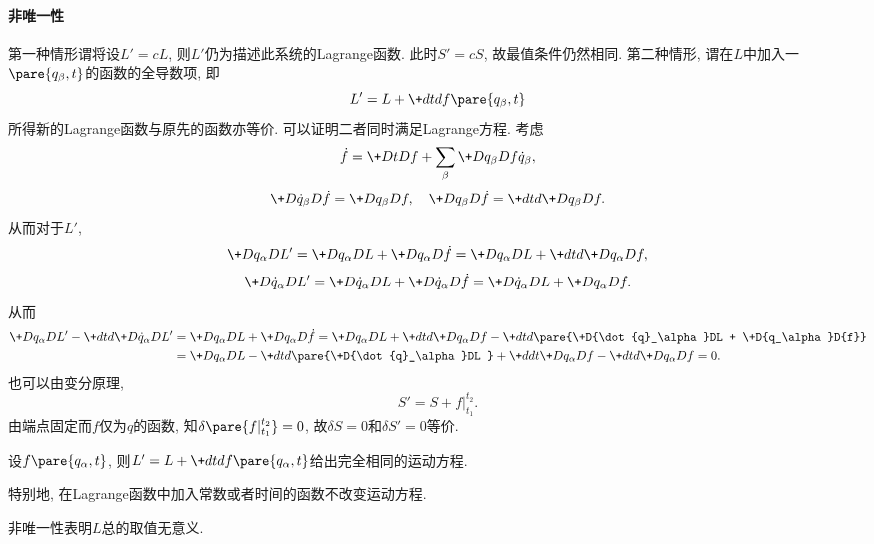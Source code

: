 \documentclass{ctexart}
\begin{document}
\paragraph{非唯一性} %
\label{par:非唯一性}

第一种情形谓将设$L'=cL$, 则$L'$仍为描述此系统的Lagrange函数. 此时$S'=cS$, 故最值条件仍然相同. 第二种情形, 谓在$L$中加入一$\pare{q_\beta,t}$的函数的全导数项, 即
\[ L' = L + \+dtd{}f\pare{q_\beta, t} \]
所得新的Lagrange函数与原先的函数亦等价. 可以证明二者同时满足Lagrange方程. 考虑
\[ \dot{f} = \+DtDf + \sum_\beta \+D{q_\beta}D{f}\dot{q}_\beta, \]
\[ \+D{\dot{q}_\beta}D{\dot{f}} = \+D{q_\beta}D{f},\quad \+D{q_\beta}D{\dot{f}} = \+dtd{}\+D{q_\beta}D{f}. \]
从而对于$L'$,
\[ \+D{q_\alpha}D{L'} = \+D{q_\alpha}DL + \+D{q_\alpha}D{\dot{f}} = \+D{q_\alpha}DL + \+dtd{}\+D{q_\alpha}D{f}, \]
\[ \+D{\dot{q}_\alpha}D{L'} = \+D{\dot{q}_\alpha}DL + \+D{\dot{q}_\alpha}D{\dot{f}} = \+D{\dot{q}_\alpha}DL + \+D{q_\alpha}D{f}. \]
从而
\begin{align*}
    \+D{q_\alpha}D{L'} - \+dtd{}\+D{\dot{q}_\alpha}D{L'} &=  \+D{q_\alpha}DL + \+D{q_\alpha}D{\dot{f}} = \+D{q_\alpha}DL + \+dtd{}\+D{q_\alpha}D{f} - \+dtd{}\pare{\+D{\dot{q}_\alpha}DL + \+D{q_\alpha}D{f}} \\
    &= \+D{q_\alpha}DL - \+dtd{}\pare{\+D{\dot{q}_\alpha}DL } + \+ddt{} \+D{q_\alpha}Df - \+dtd{} \+D{q_\alpha}Df = 0.
\end{align*}
也可以由变分原理,
\[ S' = S + f\vert_{t_1}^{t_2}. \]
由端点固定而$f$仅为$q$的函数, 知$\delta \pare{f\vert_{t_1}^{t_2}} = 0$, 故$\delta S = 0$和$\delta S' = 0$等价.
\begin{figure}[ht]
    \centering
    \centerline{
    }
    \caption{}
\end{figure}
\begin{finale}
    \begin{theorem}[规范不变性]
        \label{thm:规范不变性}
        设$f\pare{q_\alpha, t}$, 则$L' = \displaystyle L + \+dtd{}f\pare{q_\alpha,t}$给出完全相同的运动方程.
    \end{theorem}
\end{finale}
\begin{ex}
    特别地, 在Lagrange函数中加入常数或者时间的函数不改变运动方程.
\end{ex}
\begin{remark}
    非唯一性表明$L$总的取值无意义.
\end{remark}
\end{document}
